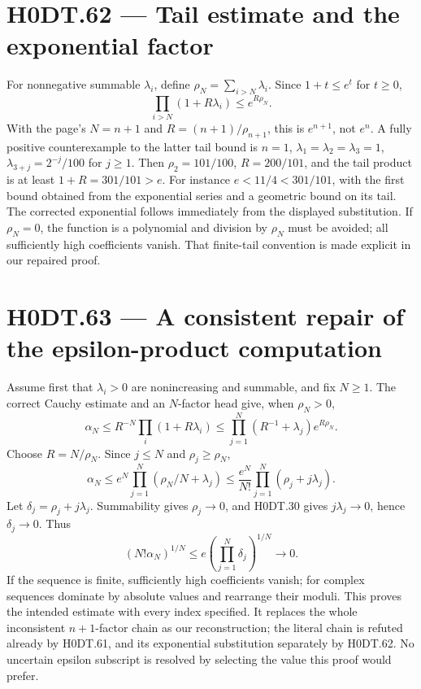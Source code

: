 \section*{H0DT.62 --- Tail estimate and the exponential factor}
For nonnegative summable $\lambda_i$, define $\rho_N=\sum_{i>N}\lambda_i$. Since $1+t\le e^t$ for $t\ge0$,
\[
 \prod_{i>N}(1+R\lambda_i)\le e^{R\rho_N}.
\]
With the page's $N=n+1$ and $R=(n+1)/\rho_{n+1}$, this is $e^{n+1}$, not $e^n$. A fully positive counterexample to the latter tail bound is $n=1$, $\lambda_1=\lambda_2=\lambda_3=1$, $\lambda_{3+j}=2^{-j}/100$ for $j\ge1$. Then $\rho_2=101/100$, $R=200/101$, and the tail product is at least $1+R=301/101>e$. For instance $e<11/4<301/101$, with the first bound obtained from the exponential series and a geometric bound on its tail. The corrected exponential follows immediately from the displayed substitution. If $\rho_N=0$, the function is a polynomial and division by $\rho_N$ must be avoided; all sufficiently high coefficients vanish. That finite-tail convention is made explicit in our repaired proof.

\section*{H0DT.63 --- A consistent repair of the epsilon-product computation}
Assume first that $\lambda_i>0$ are nonincreasing and summable, and fix $N\ge1$. The correct Cauchy estimate and an $N$-factor head give, when $\rho_N>0$,
\[
 \alpha_N\le R^{-N}\prod_i(1+R\lambda_i)
 \le\prod_{j=1}^N(R^{-1}+\lambda_j)e^{R\rho_N}.
\]
Choose $R=N/\rho_N$. Since $j\le N$ and $\rho_j\ge\rho_N$,
\[
 \alpha_N\le e^N\prod_{j=1}^N(\rho_N/N+\lambda_j)
 \le\frac{e^N}{N!}\prod_{j=1}^N(\rho_j+j\lambda_j).
\]
Let $\delta_j=\rho_j+j\lambda_j$. Summability gives $\rho_j\to0$, and H0DT.30 gives $j\lambda_j\to0$, hence $\delta_j\to0$. Thus
\[
 (N!\alpha_N)^{1/N}\le e\left(\prod_{j=1}^N\delta_j\right)^{1/N}\longrightarrow0.
\]
If the sequence is finite, sufficiently high coefficients vanish; for complex sequences dominate by absolute values and rearrange their moduli. This proves the intended estimate with every index specified. It replaces the whole inconsistent $n+1$-factor chain as our reconstruction; the literal chain is refuted already by H0DT.61, and its exponential substitution separately by H0DT.62. No uncertain epsilon subscript is resolved by selecting the value this proof would prefer.

